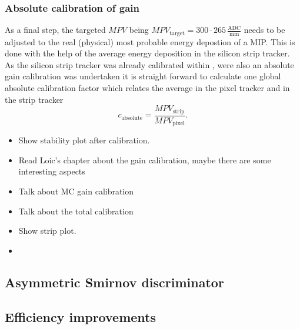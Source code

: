 \subsubsection*{Absolute calibration of gain}
As a final step, the targeted $MPV$ being $MPV_{\text{target}}=300 \cdot 265 \, \frac{\text{ADC}}{\text{mm}}$ needs to be adjusted to the real (physical) most probable energy depostion of a MIP.
This is done with the help of the average energy deposition in the silicon strip tracker.
As the silicon strip tracker was already calibrated within \cite{bib:CMS:HSCP_8TeV}, were also an absolute gain calibration was undertaken it is straight forward to calculate one global absolute calibration factor 
which relates the average \dedx in the pixel tracker and in the strip tracker
$$c_{\text{absolute}} = \frac{MPV_{\text{strip}}}{MPV_{\text{pixel}}}.$$







\begin{itemize}
\item Show stability plot after calibration.
\item Read Loic's chapter about the gain calibration, maybe there are some interesting aspects
\item Talk about MC gain calibration
\item Talk about the total calibration
\item Show strip plot.
\item 
\end{itemize}


\subsection{Asymmetric Smirnov discriminator}

\subsection{Efficiency improvements}
